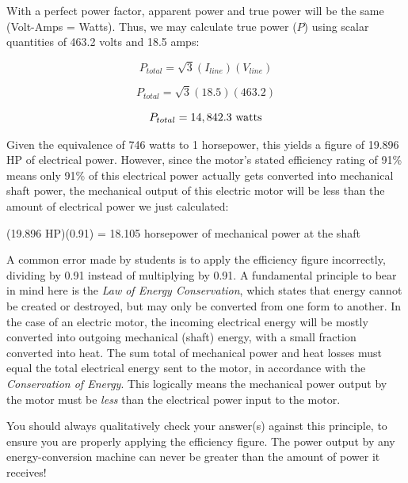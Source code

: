 With a perfect power factor, apparent power and true power will be the same (Volt-Amps = Watts).  Thus, we may calculate true power ($P$) using scalar quantities of 463.2 volts and 18.5 amps:

$$P_{total} = \sqrt{3} (I_{line}) (V_{line})$$

$$P_{total} = \sqrt{3} (18.5) (463.2)$$

$$P_{total} = 14,842.3 \hbox{ watts}$$

Given the equivalence of 746 watts to 1 horsepower, this yields a figure of 19.896 HP of electrical power.  However, since the motor's stated efficiency rating of 91\% means only 91\% of this electrical power actually gets converted into mechanical shaft power, the mechanical output of this electric motor will be less than the amount of electrical power we just calculated:

\vskip 10pt

(19.896 HP)(0.91) = 18.105 horsepower of mechanical power at the shaft

\vskip 10pt

A common error made by students is to apply the efficiency figure incorrectly, dividing by 0.91 instead of multiplying by 0.91.  A fundamental principle to bear in mind here is the {\it Law of Energy Conservation}, which states that energy cannot be created or destroyed, but may only be converted from one form to another.  In the case of an electric motor, the incoming electrical energy will be mostly converted into outgoing mechanical (shaft) energy, with a small fraction converted into heat.  The sum total of mechanical power and heat losses must equal the total electrical energy sent to the motor, in accordance with the {\it Conservation of Energy}.  This logically means the mechanical power output by the motor must be {\it less} than the electrical power input to the motor.  

You should always qualitatively check your answer(s) against this principle, to ensure you are properly applying the efficiency figure.  The power output by any energy-conversion machine can never be greater than the amount of power it receives!



